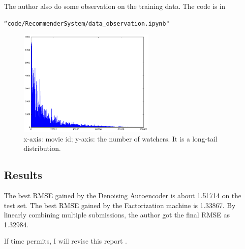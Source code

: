 \documentclass{article}
\begin{document}
The author also do some observation on the training data. The code is in


 \texttt{``code/RecommenderSystem/data\_observation.ipynb"}
\begin{figure}[!h]
	\centering
	\includegraphics[width=0.6\textwidth]{figures/movie}
	\caption{x-axis: movie id; y-axis: the number of watchers. It is a long-tail distribution.}
\end{figure}

\subsection{Results}

The best RMSE gained by the Denoising Autoencoder is about 1.51714 on the test set. The best RMSE gained by the Factorization machine is 1.33867. By linearly combining multiple submissions, the author got the final RMSE as 1.32984.



If time permits, I will revise this report \cite{salakhutdinov2007restricted,
wang2015collaborative,
strub2016hybrid,
dong2017hybrid,
rendle2012factorization,
sedhain2015autorec}.



\end{document}
